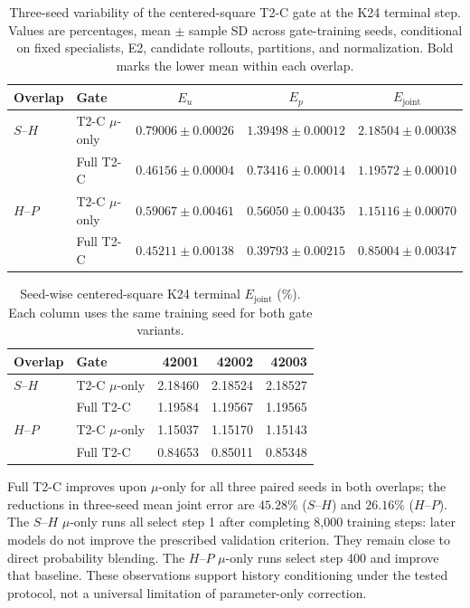\begin{table}[!htbp]
\centering
\caption{Three-seed variability of the centered-square T2-C gate at the K24
terminal step. Values are percentages, mean $\pm$ sample SD across gate-training
seeds, conditional on fixed specialists, E2, candidate rollouts, partitions,
and normalization. Bold marks the lower mean within each overlap.}
\label{tab:t2c_seed_variability}
\small
\setlength{\tabcolsep}{4pt}
\begin{tabular}{@{}llccc@{}}
\toprule
Overlap & Gate & $E_u$ & $E_p$ & $E_{\mathrm{joint}}$ \\
\midrule
$S$--$H$ & T2-C $\mu$-only & $0.79006\pm0.00026$ & $1.39498\pm0.00012$ & $2.18504\pm0.00038$ \\
 & Full T2-C & $\mathbf{0.46156\pm0.00004}$ & $\mathbf{0.73416\pm0.00014}$ & $\mathbf{1.19572\pm0.00010}$ \\
\midrule
$H$--$P$ & T2-C $\mu$-only & $0.59067\pm0.00461$ & $0.56050\pm0.00435$ & $1.15116\pm0.00070$ \\
 & Full T2-C & $\mathbf{0.45211\pm0.00138}$ & $\mathbf{0.39793\pm0.00215}$ & $\mathbf{0.85004\pm0.00347}$ \\
\bottomrule
\end{tabular}
\end{table}

\begin{table}[!htbp]
\centering
\caption{Seed-wise centered-square K24 terminal $E_{\mathrm{joint}}$ (\%).
Each column uses the same training seed for both gate variants.}
\label{tab:t2c_seedwise}
\small
\begin{tabular}{@{}llrrr@{}}
\toprule
Overlap & Gate & 42001 & 42002 & 42003 \\
\midrule
$S$--$H$ & T2-C $\mu$-only & 2.18460 & 2.18524 & 2.18527 \\
 & Full T2-C & 1.19584 & 1.19567 & 1.19565 \\
\midrule
$H$--$P$ & T2-C $\mu$-only & 1.15037 & 1.15170 & 1.15143 \\
 & Full T2-C & 0.84653 & 0.85011 & 0.85348 \\
\bottomrule
\end{tabular}
\end{table}

Full T2-C improves upon $\mu$-only for all three paired seeds in both overlaps;
the reductions in three-seed mean joint error are $45.28\%$ ($S$--$H$) and
$26.16\%$ ($H$--$P$). The $S$--$H$ $\mu$-only runs all select step 1 after
completing 8,000 training steps: later models do not improve the prescribed
validation criterion. They remain close to direct probability blending.
The $H$--$P$ $\mu$-only runs select step 400 and improve that baseline.
These observations support history conditioning under the tested protocol,
not a universal limitation of parameter-only correction.

